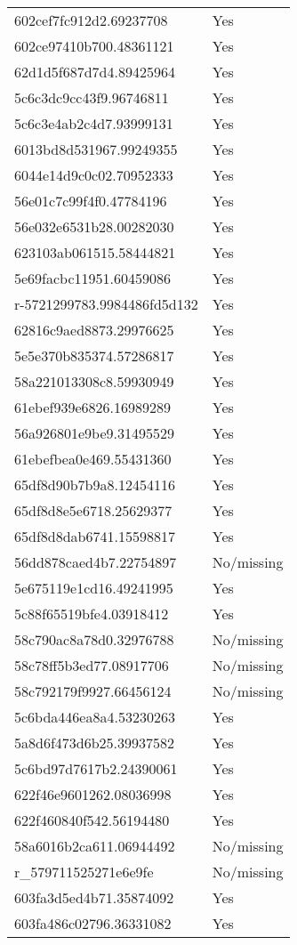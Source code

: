 \begin{tabular}{ll}
602cef7fc912d2.69237708 & Yes \\
602ce97410b700.48361121 & Yes \\
62d1d5f687d7d4.89425964 & Yes \\
5c6c3dc9cc43f9.96746811 & Yes \\
5c6c3e4ab2c4d7.93999131 & Yes \\
6013bd8d531967.99249355 & Yes \\
6044e14d9c0c02.70952333 & Yes \\
56e01c7c99f4f0.47784196 & Yes \\
56e032e6531b28.00282030 & Yes \\
623103ab061515.58444821 & Yes \\
5e69facbc11951.60459086 & Yes \\
r-5721299783.9984486fd5d132 & Yes \\
62816c9aed8873.29976625 & Yes \\
5e5e370b835374.57286817 & Yes \\
58a221013308c8.59930949 & Yes \\
61ebef939e6826.16989289 & Yes \\
56a926801e9be9.31495529 & Yes \\
61ebefbea0e469.55431360 & Yes \\
65df8d90b7b9a8.12454116 & Yes \\
65df8d8e5e6718.25629377 & Yes \\
65df8d8dab6741.15598817 & Yes \\
56dd878caed4b7.22754897 & No/missing \\
5e675119e1cd16.49241995 & Yes \\
5c88f65519bfe4.03918412 & Yes \\
58c790ac8a78d0.32976788 & No/missing \\
58c78ff5b3ed77.08917706 & No/missing \\
58c792179f9927.66456124 & No/missing \\
5c6bda446ea8a4.53230263 & Yes \\
5a8d6f473d6b25.39937582 & Yes \\
5c6bd97d7617b2.24390061 & Yes \\
622f46e9601262.08036998 & Yes \\
622f460840f542.56194480 & Yes \\
58a6016b2ca611.06944492 & No/missing \\
r_579711525271e6e9fe & No/missing \\
603fa3d5ed4b71.35874092 & Yes \\
603fa486c02796.36331082 & Yes \\

\end{tabular}
